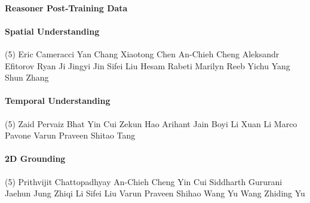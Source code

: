 \paragraph{Reasoner Post-Training Data} \mbox{}
\vspace{-0.32\baselineskip}\paragraph{\footnotesize Spatial Understanding} \mbox{}
\vspace{-0.32\baselineskip}
\begingroup
\footnotesize
\begin{tasks}[label=\relax, label-width=0pt, item-indent=4pt](5)
\task Eric Cameracci
\task Yan Chang
\task Xiaotong Chen
\task An-Chieh Cheng
\task Aleksandr Efitorov
\task Ryan Ji
\task Jingyi Jin
\task Sifei Liu
\task Hesam Rabeti
\task Marilyn Reeb
\task Yichu Yang
\task Shun Zhang
\end{tasks}
\endgroup

\vspace{-0.32\baselineskip}\paragraph{\footnotesize Temporal Understanding} \mbox{}
\vspace{-0.32\baselineskip}
\begingroup
\footnotesize
\begin{tasks}[label=\relax, label-width=0pt, item-indent=4pt](5)
\task Zaid Pervaiz Bhat
\task Yin Cui
\task Zekun Hao 
\task Arihant Jain
\task Boyi Li 
\task Xuan Li
\task Marco Pavone 
\task Varun Praveen
\task Shitao Tang 
\end{tasks}
\endgroup

\vspace{-0.32\baselineskip}\paragraph{\footnotesize 2D Grounding} \mbox{}
\vspace{-0.32\baselineskip}
\begingroup
\footnotesize
\begin{tasks}[label=\relax, label-width=0pt, item-indent=4pt](5)
\task Prithvijit Chattopadhyay 
\task An-Chieh Cheng
\task Yin Cui 
\task Siddharth Gururani 
\task Jaehun Jung 
\task Zhiqi Li 
\task Sifei Liu
\task Varun Praveen 
\task Shihao Wang 
\task Yu Wang 
\task Zhiding Yu 
\end{tasks}
\endgroup

